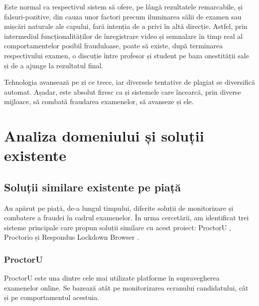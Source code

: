 \documentclass[12pt,a4paper]{article}
\begin{document}
Este normal ca respectivul sistem să ofere, pe lângă rezultatele
remarcabile, și falsuri-pozitive, din cauza unor factori precum
iluminarea sălii de examen sau mișcări naturale ale capului, fară
intenția de a privi în altă direcție. Astfel, prin intermediul
funcționalităților de înregistrare video și semnalare în timp real al
comportamentelor posibil frauduloase, poate să existe, după terminarea
respectivului examen, o discuție între profesor și student pe baza
onestității sale și de a ajunge la rezultatul final. 

Tehnologia avansează pe zi ce trece, iar diversele tentative de plagiat se diversifică automat.
Așadar, este absolut firesc ca și sistemele care încearcă, prin
diverse mijloace, să combată fraudarea examenelor, să avanseze și ele.

\section{Analiza domeniului și soluții existente}

\subsection{Soluții similare existente pe piață}

Au apărut pe piață, de-a lungul timpului, diferite soluții de
monitorizare și combatere a fraudei în cadrul examenelor. În urma cercetării, am identificat
trei sisteme principale care propun soluții similare cu acest proiect: ProctorU \cite{proctoru}, 
Proctorio \cite{proctorio} și Respondus Lockdown Browser \cite{respondus}.

\subsubsection{ProctorU}
ProctorU este una dintre cele mai utilizate platforme în
supravegherea examenelor online. Se bazează atât pe monitorizarea
ecranului candidatului, cât și pe comportamentul acestuia. 
\end{document}
